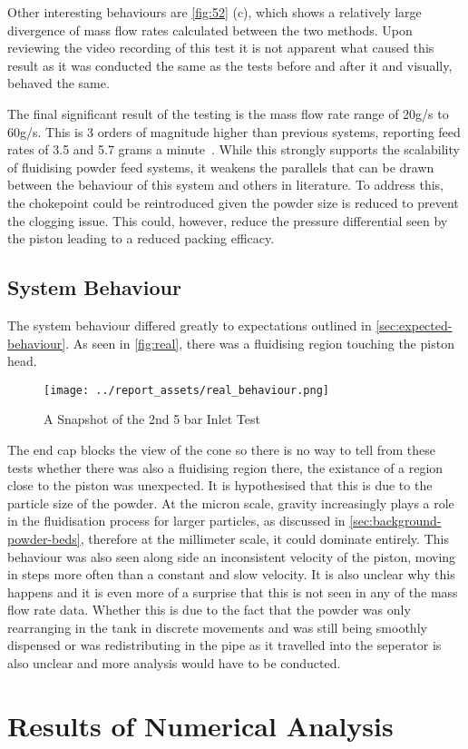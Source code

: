 Other interesting behaviours are \autoref{fig:52} (c), which shows a relatively large divergence of mass flow rates calculated between the two methods. Upon reviewing the video recording of this test it is not apparent what caused this result as it was conducted the same as the tests before and after it and visually, behaved the same.

The final significant result of the testing is the mass flow rate range of 20g/s to 60g/s. This is 3 orders of magnitude higher than previous systems, reporting feed rates of 3.5 and 5.7 grams a minute~\cite{BHATTIPROLU20181}. While this strongly supports the scalability of fluidising powder feed systems, it weakens the parallels that can be drawn between the behaviour of this system and others in literature. To address this, the chokepoint could be reintroduced given the powder size is reduced to prevent the clogging issue. This could, however, reduce the pressure differential seen by the piston leading to a reduced packing efficacy.

\subsection{System Behaviour}
The system behaviour differed greatly to expectations outlined in \autoref{sec:expected-behaviour}. As seen in \autoref{fig:real}, there was a fluidising region touching the piston head. 
\begin{figure}[htbp]
    \centering
    
    \begin{minipage}{0.6\textwidth}
        \centering
        \texttt{[image: ../report\_assets/real\_behaviour.png]}
        \caption{A Snapshot of the 2nd 5 bar Inlet Test}\label{fig:real}
    \end{minipage}
    
\end{figure}
The end cap blocks the view of the cone so there is no way to tell from these tests whether there was also a fluidising region there, the existance of a region close to the piston was unexpected. It is hypothesised that this is due to the particle size of the powder. At the micron scale, gravity increasingly plays a role in the fluidisation process for larger particles, as discussed in \autoref{sec:background-powder-beds}, therefore at the millimeter scale, it could dominate entirely. This behaviour was also seen along side an inconsistent velocity of the piston, moving in steps more often than a constant and slow velocity. It is also unclear why this happens and it is even more of a surprise that this is not seen in any of the mass flow rate data. Whether this is due to the fact that the powder was only rearranging in the tank in discrete movements and was still being smoothly dispensed or was redistributing in the pipe as it travelled into the seperator is also unclear and more analysis would have to be conducted.

\section{Results of Numerical Analysis}

